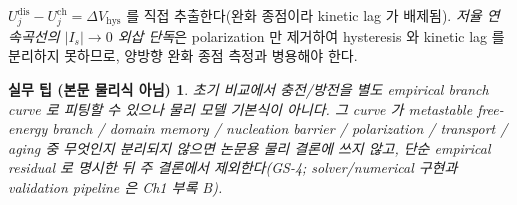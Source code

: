 \documentclass[11pt,a4paper]{article}
\newtheorem*{practicebox}{실무 팁 (본문 물리식 아님)}
\newcommand{\dis}{\mathrm{dis}}
\newcommand{\chg}{\mathrm{ch}}
\newcommand{\hys}{\mathrm{hys}}
\begin{document}
$U_j^\dis-U_j^\chg=\Delta V_\hys$ 를 직접 추출한다(완화 종점이라 kinetic lag 가 배제됨). \emph{저율 연속곡선의
$|I_s|\to0$ 외삽 단독}은 polarization 만 제거하여 hysteresis 와 kinetic lag 를 분리하지 못하므로, 양방향 완화
종점 측정과 병용해야 한다.
\begin{practicebox}
초기 비교에서 충전/방전을 별도 empirical branch curve 로 피팅할 수 있으나 \emph{물리 모델 기본식이 아니다}.
그 curve 가 metastable free-energy branch / domain memory / nucleation barrier / polarization / transport /
aging 중 무엇인지 분리되지 않으면 논문용 물리 결론에 쓰지 않고, 단순 empirical residual 로 명시한 뒤 주 결론에서
제외한다(GS-4; solver/numerical 구현과 validation pipeline 은 Ch1 부록 B).
\end{practicebox}

\end{document}
